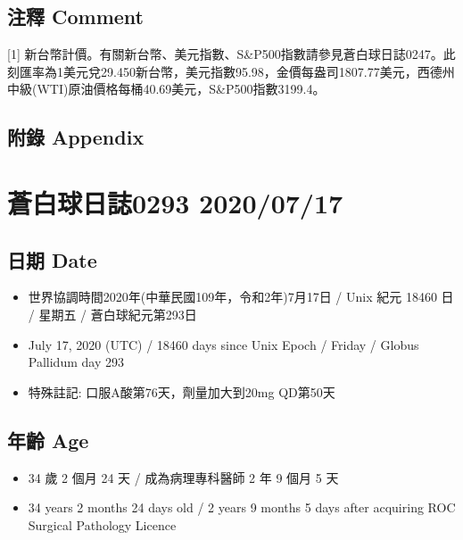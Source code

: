 \documentclass[
]{article}
\providecommand{\tightlist}{%
  \setlength{\itemsep}{0pt}\setlength{\parskip}{0pt}}
\begin{document}
\hypertarget{ux6ce8ux91cb-comment-15}{%
\subsection{注釋 Comment}\label{ux6ce8ux91cb-comment-15}}

{[}1{]}
新台幣計價。有關新台幣、美元指數、S\&P500指數請參見蒼白球日誌0247。此刻匯率為1美元兌29.450新台幣，美元指數95.98，金價每盎司1807.77美元，西德州中級(WTI)原油價格每桶40.69美元，S\&P500指數3199.4。

\hypertarget{ux9644ux9304-appendix-15}{%
\subsection{附錄 Appendix}\label{ux9644ux9304-appendix-15}}

\hypertarget{ux84bcux767dux7403ux65e5ux8a8c0293-20200717}{%
\section{蒼白球日誌0293
2020/07/17}\label{ux84bcux767dux7403ux65e5ux8a8c0293-20200717}}

\hypertarget{ux65e5ux671f-date-16}{%
\subsection{日期 Date}\label{ux65e5ux671f-date-16}}

\begin{itemize}
\tightlist
\item
  世界協調時間2020年(中華民國109年，令和2年)7月17日 / Unix 紀元 18460 日
  / 星期五 / 蒼白球紀元第293日
\item
  July 17, 2020 (UTC) / 18460 days since Unix Epoch / Friday / Globus
  Pallidum day 293
\item
  特殊註記: 口服A酸第76天，劑量加大到20mg QD第50天
\end{itemize}

\hypertarget{ux5e74ux9f61-age-16}{%
\subsection{年齡 Age}\label{ux5e74ux9f61-age-16}}

\begin{itemize}
\tightlist
\item
  34 歲 2 個月 24 天 / 成為病理專科醫師 2 年 9 個月 5 天
\item
  34 years 2 months 24 days old / 2 years 9 months 5 days after
  acquiring ROC Surgical Pathology Licence
\end{itemize}
\end{document}
